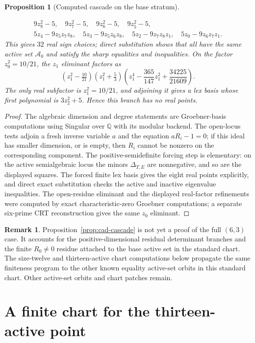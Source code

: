\documentclass[11pt]{article}
\numberwithin{equation}{section}
\newtheorem{proposition}[theorem]{Proposition}
\theoremstyle{definition}
\newtheorem{remark}[theorem]{Remark}
\newcommand{\cA}{\mathcal A}
\begin{document}
\begin{proposition}[Computed cascade on the base stratum]
\begin{enumerate}[leftmargin=*]
\[\begin{gathered}
9z_8^2-5,\quad 9z_7^2-5,\quad 9z_6^2-5,\quad 9z_5^2-5,\\
5z_4-9z_5z_7z_8,\quad
5z_3-9z_5z_6z_8,\quad
5z_2-9z_7z_8z_1,\quad
5z_0-9z_6z_7z_1 .
\end{gathered}
\]
This gives $32$ real sign choices; direct substitution shows that all have the
same active set $\cA_0$ and satisfy the sharp equalities and inequalities.
On the factor $z_0^2=10/21$, the $z_1$ eliminant factors as
\[
(z_1^2-\tfrac{10}{21})(z_1^2+\tfrac53)
\left(z_1^4-\frac{365}{147}z_1^2+\frac{34225}{21609}\right).
\]
The only real subfactor is $z_1^2=10/21$, and adjoining it gives a lex basis
whose first polynomial is $3z_2^2+5$.  Hence this branch has no real points.
\end{enumerate}
\end{proposition}

\begin{proof}
The algebraic dimension and degree statements are Groebner-basis computations
using Singular over $\mathbb Q$ with its modular backend.  The open-locus tests
adjoin a fresh inverse variable $a$ and the equation $aR_i-1=0$; if this ideal
has smaller dimension, or is empty, then $R_i$ cannot be nonzero on the
corresponding component.  The positive-semidefinite forcing step is elementary:
on the active semialgebraic locus the minors $\Delta_{T,E}$ are nonnegative, and
so are the displayed squares.  The forced finite lex basis gives the eight real
points explicitly, and direct exact substitution checks the active and inactive
eigenvalue inequalities.  The open-residue eliminant and the displayed
real-factor refinements were computed by exact characteristic-zero Groebner
computations; a separate six-prime CRT reconstruction gives the same $z_0$
eliminant.
\end{proof}

\begin{remark}
Proposition~\ref{prop:cad-cascade} is not yet a proof of the full
$(6,3)$ case.  It accounts for the positive-dimensional residual determinant
branches and the finite $R_0\ne0$ residue attached to the base active set in the
standard chart.  The size-twelve and thirteen-active chart computations below
propagate the same finiteness program to the other known equality active-set
orbits in this standard chart.  Other active-set orbits and chart patches remain.
\end{remark}

\section{A finite chart for the thirteen-active point}\label{sec:seventh-chart}
\end{document}
